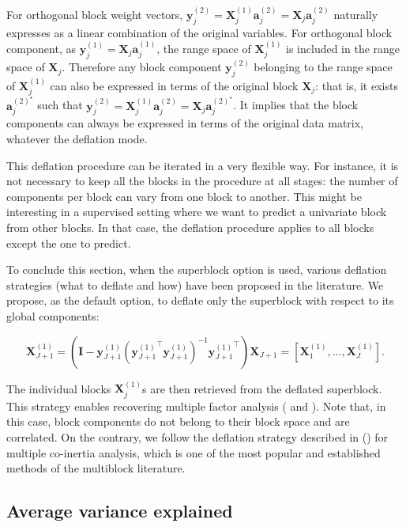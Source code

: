 \documentclass[
]{jss}
\begin{document}
For orthogonal block weight vectors,
\(\mathbf y_j^{(2)} = \mathbf X_j^{(1)} \mathbf a_j^{(2)} = \mathbf X_j \mathbf a_j^{(2)}\)
naturally expresses as a linear combination of the original variables.
For orthogonal block component, as
\(\mathbf y_j^{(1)} = \mathbf X_j \mathbf a_j^{(1)}\), the range space
of \(\mathbf X_j^{(1)}\) is included in the range space of
\(\mathbf X_j\). Therefore any block component \(\mathbf y_j^{(2)}\)
belonging to the range space of \(\mathbf X_j^{(1)}\) can also be
expressed in terms of the original block \(\mathbf X_j\): that is, it
exists \(\mathbf a_j^{(2)^\star}\) such that
\(\mathbf y_j^{(2)} = \mathbf X_j^{(1)} \mathbf a_j^{(2)} = \mathbf X_j \mathbf a_j^{(2)^\star}\).
It implies that the block components can always be expressed in terms of
the original data matrix, whatever the deflation mode.

This deflation procedure can be iterated in a very flexible way. For
instance, it is not necessary to keep all the blocks in the procedure at
all stages: the number of components per block can vary from one block
to another. This might be interesting in a supervised setting where we
want to predict a univariate block from other blocks. In that case, the
deflation procedure applies to all blocks except the one to predict.

To conclude this section, when the superblock option is used, various
deflation strategies (what to deflate and how) have been proposed in the
literature. We propose, as the default option, to deflate only the
superblock with respect to its global components:

\[\mathbf X_{J+1}^{(1)} = \left(\mathbf{I} -  \mathbf y_{J+1}^{(1)} \left( { \mathbf y_{J+1}^{(1)}}^\top  \mathbf y_{J+1}^{(1)} \right)^{-1}{ \mathbf y_{J+1}^{(1)}}^\top \right) \mathbf X_{J+1} = \left[ \mathbf X_1^{(1)}, \ldots, \mathbf X_J^{(1)} \right].\]

The individual blocks \(\mathbf X_j^{(1)}\)s are then retrieved from the
deflated superblock. This strategy enables recovering multiple factor
analysis ( and ). Note that,
in this case, block components do not belong to their block space and
are correlated. On the contrary, we follow the deflation strategy
described in \cite{Chessel1996} () for multiple
co-inertia analysis, which is one of the most popular and established
methods of the multiblock literature.

\hypertarget{average-variance-explained}{%
\subsection{Average variance
explained}\label{average-variance-explained}}
\end{document}
